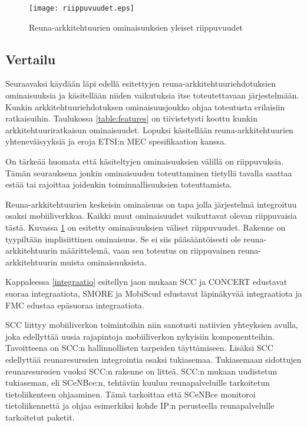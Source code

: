\begin{figure}[tb]
\centering
\texttt{[image: riippuvuudet.eps]}
\caption{Reuna-arkkitehtuurien ominaisuuksien yleiset riippuvuudet} \label{fig:riippuvuudet}
\end{figure}

\subsection{Vertailu}
Seuraavaksi käydään läpi edellä esitettyjen reuna-arkkitehtuuriehdotuksien ominaisuuksia ja käsitellään niiden vaikutuksia itse toteutettavaan järjestelmään.
Kunkin arkkitehtuuriehdotuksen ominaisuusjoukko ohjaa toteutusta erilaisiin ratkaisuihin. Taulukossa \ref{table:features} on tiivistetysti koottu kunkin arkkitehtuuriratkaisun ominaisuudet.
Lopuksi käsitellään reuna-arkkitehtuurien yhteneväisyyksiä ja eroja ETSI:n MEC spesifikaation kanssa.

On tärkeää huomata että käsiteltyjen ominaisuuksien välillä on riippuvuksia. Tämän seurauksena jonkin ominaisuuden toteuttaminen tietyllä tavalla saattaa estää tai rajoittaa joidenkin toiminnallisuuksien toteuttamista. 


Reuna-arkkitehtuurien keskeisin ominaisuus on tapa jolla järjestelmä integroituu osaksi mobiiliverkkoa. Kaikki muut ominaisuudet vaikuttavat olevan riippuvaisia tästä.
Kuvassa \ref{fig:riippuvuudet} on esitetty ominaisuuksien väliset riippuvuudet.
Rakenne on tyypiltään implisiittinen ominaisuus. Se ei siis pääsääntöisesti ole reuna-arkkitehtuurin määrittelemä, vaan sen toteutus on riippuvainen reuna-arkkitehtuurin muista ominaisuuksista.

Kappaleessa \ref{integraatio} esitellyn jaon mukaan SCC ja CONCERT edustavat suoraa integraatiota, SMORE ja MobiScud edustavat läpinäkyvää integraatiota ja FMC edustaa epäsuoraa integraatiota.

SCC liittyy mobiiliverkon toimintoihin niin sanotusti natiivien yhteyksien avulla, joka edellyttää uusia rajapintoja mobiiliverkon nykyisiin komponentteihin. Tavoitteena on SCC:n hallinnollisten tarpeiden täyttämiseen. Lisäksi SCC edellyttää reunaresurssien integrointia osaksi tukiasemaa. 
Tukiasemaan sidottujen reunaresurssien vuoksi SCC:n rakenne on litteä. 
SCC:n mukaan uudistetun tukiaseman, eli SCeNBce:n, tehtäviin kuuluu reunapalveluille tarkoitetun tietoliikenteen ohjaaminen. Tämä tarkoittaa että SCeNBce monitoroi tietoliikennettä ja ohjaa esimerkiksi kohde IP:n perusteella reunapalvelulle tarkoitetut paketit.

